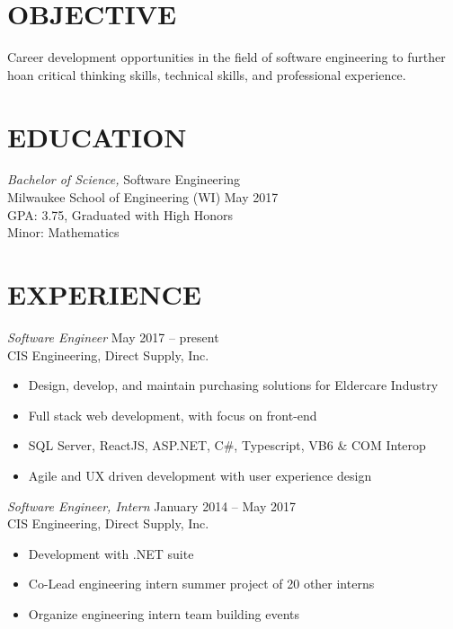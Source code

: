 \documentclass[line,margin]{res}
\begin{document}

\address{austinhartline@gmail.com | (𝟺𝟷𝟺) 𝟹𝟹𝟺-𝟺𝟶𝟼𝟷}

\begin{resume}

\section{OBJECTIVE}
Career development opportunities in the field of software engineering to further hoan critical thinking skills, technical skills, and professional experience.

\section{EDUCATION}
{\sl Bachelor of Science,} Software Engineering \\
Milwaukee School of Engineering (WI) \hfill May 2017 \\
GPA: 3.75, Graduated with High Honors \\
Minor: Mathematics

\section{EXPERIENCE}
{\sl Software Engineer} \hfill May 2017 -- present \\
CIS Engineering, Direct Supply, Inc.
\begin{itemize}
	\item Design, develop, and maintain purchasing solutions for Eldercare Industry
	\item Full stack web development, with focus on front-end
	\item SQL Server, ReactJS, ASP.NET, C\#, Typescript, VB6 \& COM Interop
	\item Agile and UX driven development with user experience design
\end{itemize}

{\sl Software Engineer, Intern} \hfill January 2014 -- May 2017 \\
CIS Engineering, Direct Supply, Inc.
\begin{itemize}
	\item Development with .NET suite
	\item Co-Lead engineering intern summer project of 20 other interns
	\item Organize engineering intern team building events
\end{itemize}


\end{resume}
\end{document}
